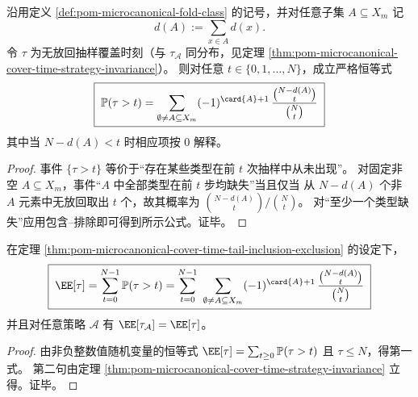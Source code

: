 \begin{theorem}\label{thm:pom-microcanonical-cover-time-tail-inclusion-exclusion}
沿用定义 \ref{def:pom-microcanonical-fold-class} 的记号，并对任意子集 \(A\subseteq X_m\) 记
\[
d(A):=\sum_{x\in A}d(x).
\]
令 \(\tau\) 为无放回抽样覆盖时刻（与 \(\tau_{\mathcal A}\) 同分布，见定理 \ref{thm:pom-microcanonical-cover-time-strategy-invariance}）。
则对任意 \(t\in\{0,1,\dots,N\}\)，成立严格恒等式
\[
\boxed{\;
\mathbb{P}(\tau>t)
=\sum_{\emptyset\neq A\subseteq X_m}(-1)^{\card{A}+1}\,
\frac{\binom{N-d(A)}{t}}{\binom{N}{t}}\;}
\]
其中当 \(N-d(A)<t\) 时相应项按 \(0\) 解释。
\end{theorem}
\begin{proof}
事件 \(\{\tau>t\}\) 等价于“存在某些类型在前 \(t\) 次抽样中从未出现”。
对固定非空 \(A\subseteq X_m\)，事件“\(A\) 中全部类型在前 \(t\) 步均缺失”当且仅当
从 \(N-d(A)\) 个非 \(A\) 元素中无放回取出 \(t\) 个，故其概率为 \(\binom{N-d(A)}{t}/\binom{N}{t}\)。
对“至少一个类型缺失”应用包含--排除即可得到所示公式。证毕。
\end{proof}

\begin{corollary}[覆盖时刻的期望闭式]\label{cor:pom-microcanonical-cover-time-mean}
在定理 \ref{thm:pom-microcanonical-cover-time-tail-inclusion-exclusion} 的设定下，
\[
\boxed{\;
\EE[\tau]
=\sum_{t=0}^{N-1}\mathbb{P}(\tau>t)
=\sum_{t=0}^{N-1}\ \sum_{\emptyset\neq A\subseteq X_m}(-1)^{\card{A}+1}\,
\frac{\binom{N-d(A)}{t}}{\binom{N}{t}}\;}
\]
并且对任意策略 \(\mathcal A\) 有 \(\EE[\tau_{\mathcal A}]=\EE[\tau]\)。
\end{corollary}
\begin{proof}
由非负整数值随机变量的恒等式 \(\EE[\tau]=\sum_{t\ge 0}\mathbb{P}(\tau>t)\) 且 \(\tau\le N\)，得第一式。
第二句由定理 \ref{thm:pom-microcanonical-cover-time-strategy-invariance} 立得。证毕。
\end{proof}

